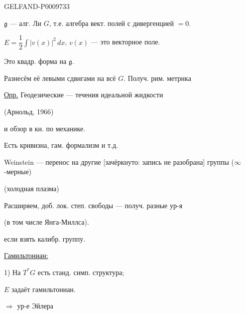 \begin{GelfandAdjacentEvidence}{GELFAND-P000973}{3}


$\mathfrak g$ --- алг. Ли $G$, т.е. алгебра вект. полей с дивергенцией $=0$.

 $E=\dfrac12\displaystyle\int|v(x)|^2\,dx$,\quad
$v(x)$ --- это векторное поле.

Это квадр. форма на $\mathfrak g$.

Разнесём её левыми сдвигами на всё $G$. Получ. рим. метрика

\underline{Опр.} Геодезические --- течения идеальной жидкости

(Арнольд, 1966)

 и обзор в кн. по механике.

Есть кривизна, гам. формализм и т.д.

Weinstein --- перенос на другие [зачёркнуто: запись не разобрана] группы ($\infty$-мерные)
\end{GelfandAdjacentEvidence}


\quad{}

(холодная плазма)

Расширяем, доб. лок. степ. свободы --- получ. разные ур-я

(в том числе Янга-Миллса).

если взять калибр. группу.

\underline{Гамильтониан:}

1) На $T^*G$ есть станд. симп. структура;

$E$ задаёт гамильтониан.

$\Rightarrow$ ур-е Эйлера

